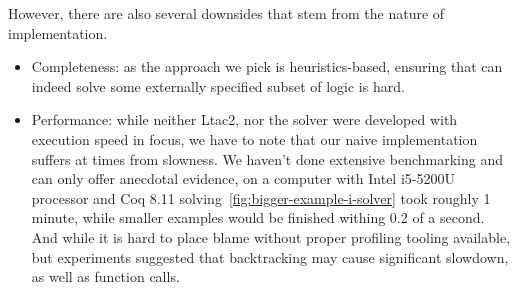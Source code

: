 However, there are also several downsides that stem from the nature of implementation.
\begin{itemize}
\item Completeness: as the approach we pick is heuristics-based, ensuring that  can indeed solve some externally specified subset of logic is hard.
\item Performance: while neither Ltac2, nor the solver were developed with execution speed in focus, we have to note that our naive implementation suffers at times from slowness.
  We haven't done extensive benchmarking and can only offer anecdotal evidence, on a computer with Intel i5-5200U processor and Coq 8.11 solving~\ref{fig:bigger-example-i-solver} took roughly 1 minute, while smaller examples would be finished withing 0.2 of a second.
  And while it is hard to place blame without proper profiling tooling available, but experiments suggested that backtracking may cause significant slowdown, as well as function calls.
\end{itemize}


